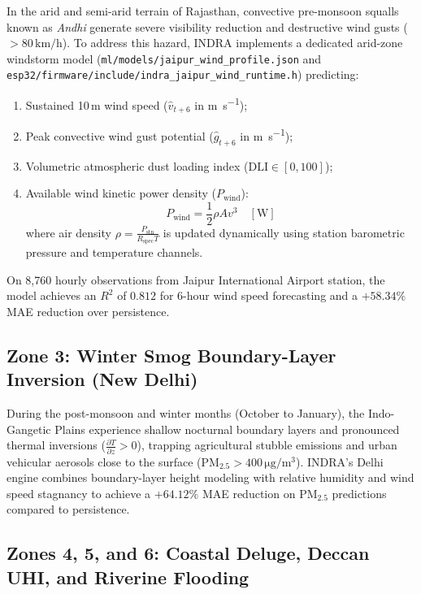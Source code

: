 \documentclass[journal,a4paper]{IEEEtran}
\begin{document}
In the arid and semi-arid terrain of Rajasthan, convective pre-monsoon squalls known as \textit{Andhi} generate severe visibility reduction and destructive wind gusts ($> 80\,\si{\kilo\metre\per\hour}$). To address this hazard, INDRA implements a dedicated arid-zone windstorm model (\nolinkurl{ml/models/jaipur_wind_profile.json} and \nolinkurl{esp32/firmware/include/indra_jaipur_wind_runtime.h}) predicting:
\begin{enumerate}
  \item Sustained 10\,m wind speed ($\hat{v}_{t+6}$ in \si{\metre\per\second});
  \item Peak convective wind gust potential ($\hat{g}_{t+6}$ in \si{\metre\per\second});
  \item Volumetric atmospheric dust loading index ($\text{DLI} \in [0, 100]$);
  \item Available wind kinetic power density ($P_{\text{wind}}$):
  \begin{equation}
  P_{\text{wind}} = \frac{1}{2} \rho A v^3 \quad \left[\si{\watt}\right]
  \end{equation}
  where air density $\rho = \frac{P_{\text{stn}}}{R_{\text{spec}} T}$ is updated dynamically using station barometric pressure and temperature channels.
\end{enumerate}
On 8{,}760 hourly observations from Jaipur International Airport station, the model achieves an $R^2$ of $0.812$ for 6-hour wind speed forecasting and a $+58.34\%$ MAE reduction over persistence.

\subsection{Zone 3: Winter Smog Boundary-Layer Inversion (New Delhi)}

During the post-monsoon and winter months (October to January), the Indo-Gangetic Plains experience shallow nocturnal boundary layers and pronounced thermal inversions ($\frac{\partial T}{\partial z} > 0$), trapping agricultural stubble emissions and urban vehicular aerosols close to the surface ($\text{PM}_{2.5} > 400\,\si{\micro\gram\per\cubic\metre}$). INDRA's Delhi engine combines boundary-layer height modeling with relative humidity and wind speed stagnancy to achieve a $+64.12\%$ MAE reduction on $\text{PM}_{2.5}$ predictions compared to persistence.

\subsection{Zones 4, 5, and 6: Coastal Deluge, Deccan UHI, and Riverine Flooding}
\end{document}
